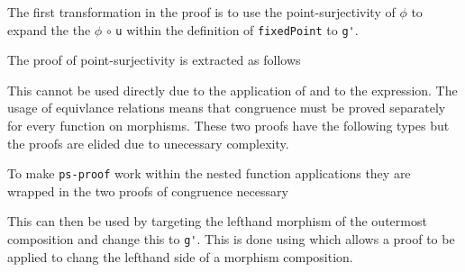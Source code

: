 
The first transformation in the proof is to use the point-surjectivity of
$\phi$ to expand the the $\phi$ $\circ$ \verb|u| within the definition of
\verb|fixedPoint| to \verb|g'|.

The proof of point-surjectivity is extracted as follows


This cannot be used directly due to the application of  and
 to the expression. The usage of equivlance relations
means that congruence must be proved separately for every function on
morphisms. These two proofs have the following types but the proofs are elided
due to unecessary complexity.

\begin{AgdaSuppressSpace}
\end{AgdaSuppressSpace}

To make \verb|ps-proof| work within the nested function applications they are
wrapped in the two proofs of congruence necessary


This can then be used by targeting the lefthand morphism of the outermost
composition and change this to \verb|g'|. This is done using
 which allows a proof to be applied to chang the lefthand
side of a morphism composition.

